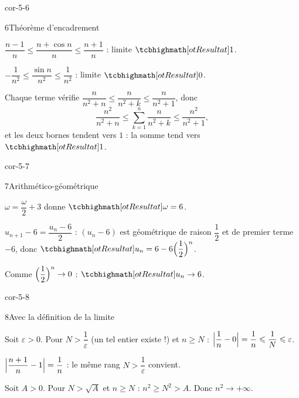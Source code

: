 \begin{blocLivre}{cor-5-6}
\begin{corrige}{6}{Théorème d'encadrement}
\begin{questions}
  \item $\dfrac{n-1}{n}\leq\dfrac{n+\cos n}{n}\leq\dfrac{n+1}{n}$ :
    limite $\res{1}$.
  \item $-\dfrac{1}{n^{2}}\leq\dfrac{\sin n}{n^{2}}\leq\dfrac{1}{n^{2}}$ :
    limite $\res{0}$.
  \item Chaque terme vérifie
    $\dfrac{n}{n^{2}+n}\leq\dfrac{n}{n^{2}+k}\leq\dfrac{n}{n^{2}+1}$, donc
    \[
      \frac{n^{2}}{n^{2}+n}\leq\sum_{k=1}^{n}\frac{n}{n^{2}+k}\leq\frac{n^{2}}{n^{2}+1},
    \]
    et les deux bornes tendent vers $1$ : la somme tend vers $\res{1}$.
\end{questions}
\end{corrige}
\end{blocLivre}

\begin{blocLivre}{cor-5-7}
\begin{corrige}{7}{Arithmético-géométrique}
\begin{questions}
  \item $\omega=\dfrac{\omega}{2}+3$ donne $\res{\omega=6}$.
  \item $u_{n+1}-6=\dfrac{u_n-6}{2}$ : $(u_n-6)$ est géométrique de raison
    $\dfrac12$ et de premier terme $-6$, donc
    $\res{u_n=6-6\Bigl(\dfrac12\Bigr)^{n}}$.
  \item Comme $\Bigl(\dfrac12\Bigr)^{n}\to0$ : $\res{u_n\to6}$.
\end{questions}
\end{corrige}
\end{blocLivre}

\begin{blocLivre}{cor-5-8}
\begin{corrige}{8}{Avec la définition de la limite}
\begin{questions}
  \item Soit $\varepsilon>0$. Pour $N>\dfrac{1}{\varepsilon}$ (un tel entier
    existe !) et $n\geq N$ : $\Bigl|\dfrac1n-0\Bigr|=\dfrac1n\leq\dfrac1N\leq\varepsilon$.
  \item $\Bigl|\dfrac{n+1}{n}-1\Bigr|=\dfrac1n$ : le même rang
    $N>\dfrac{1}{\varepsilon}$ convient.
  \item Soit $A>0$. Pour $N>\sqrt A$ et $n\geq N$ : $n^{2}\geq N^{2}>A$.
    Donc $n^{2}\to+\infty$.
\end{questions}
\end{corrige}
\end{blocLivre}

